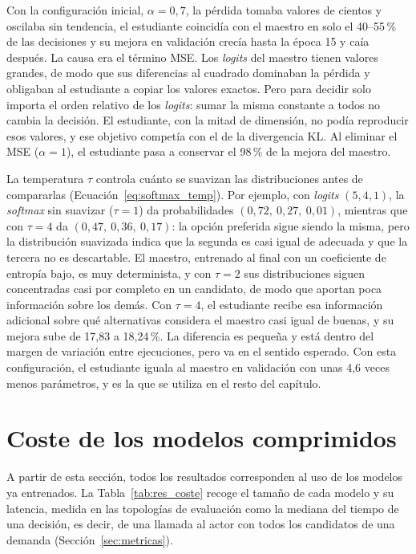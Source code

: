 Con la configuración inicial, $\alpha = 0{,}7$, la pérdida tomaba valores de cientos y oscilaba sin tendencia, el estudiante coincidía con el maestro en solo el 40--55\,\% de las decisiones y su mejora en validación crecía hasta la época 15 y caía después. La causa era el término MSE. Los \textit{logits} del maestro tienen valores grandes, de modo que sus diferencias al cuadrado dominaban la pérdida y obligaban al estudiante a copiar los valores exactos. Pero para decidir solo importa el orden relativo de los \textit{logits}: sumar la misma constante a todos no cambia la decisión. El estudiante, con la mitad de dimensión, no podía reproducir esos valores, y ese objetivo competía con el de la divergencia KL. Al eliminar el MSE ($\alpha = 1$), el estudiante pasa a conservar el 98\,\% de la mejora del maestro.

La temperatura $\tau$ controla cuánto se suavizan las distribuciones antes de compararlas (Ecuación~\eqref{eq:softmax_temp}). Por ejemplo, con \textit{logits} $(5, 4, 1)$, la \textit{softmax} sin suavizar ($\tau = 1$) da probabilidades $(0{,}72,\ 0{,}27,\ 0{,}01)$, mientras que con $\tau = 4$ da $(0{,}47,\ 0{,}36,\ 0{,}17)$: la opción preferida sigue siendo la misma, pero la distribución suavizada indica que la segunda es casi igual de adecuada y que la tercera no es descartable. El maestro, entrenado al final con un coeficiente de entropía bajo, es muy determinista, y con $\tau = 2$ sus distribuciones siguen concentradas casi por completo en un candidato, de modo que aportan poca información sobre los demás. Con $\tau = 4$, el estudiante recibe esa información adicional sobre qué alternativas considera el maestro casi igual de buenas, y su mejora sube de 17,83 a 18,24\,\%. La diferencia es pequeña y está dentro del margen de variación entre ejecuciones, pero va en el sentido esperado. Con esta configuración, el estudiante iguala al maestro en validación con unas 4,6 veces menos parámetros, y es la que se utiliza en el resto del capítulo.

\section{Coste de los modelos comprimidos}\label{sec:res_coste}

A partir de esta sección, todos los resultados corresponden al uso de los modelos ya entrenados. La Tabla~\ref{tab:res_coste} recoge el tamaño de cada modelo y su latencia, medida en las topologías de evaluación como la mediana del tiempo de una decisión, es decir, de una llamada al actor con todos los candidatos de una demanda (Sección~\ref{sec:metricas}).

